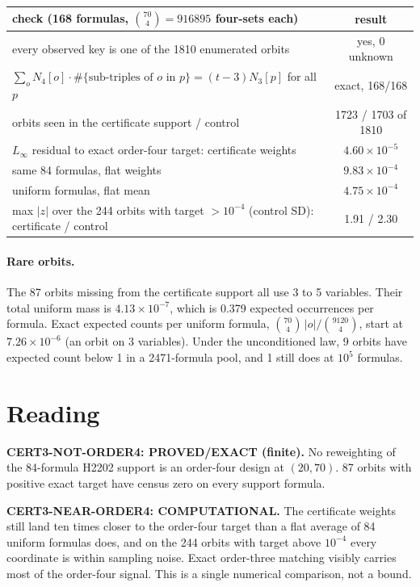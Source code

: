 \documentclass[11pt]{article}
\begin{document}
\begin{center}\begin{tabular}{lc}\toprule
check (168 formulas, $\binom{70}{4}=916895$ four-sets each) & result\\\midrule
every observed key is one of the 1810 enumerated orbits & yes, 0 unknown\\
$\sum_o N_4[o]\cdot\#\{\text{sub-triples of }o\text{ in }p\}=(t-3)N_3[p]$ for all $p$ & exact, 168/168\\
orbits seen in the certificate support / control & 1723 / 1703 of 1810\\\midrule
$L_\infty$ residual to exact order-four target: certificate weights & $4.60\times10^{-5}$\\
\quad same 84 formulas, flat weights & $9.83\times10^{-4}$\\
\quad 84 uniform formulas, flat mean & $4.75\times10^{-4}$\\
max $|z|$ over the 244 orbits with target $>10^{-4}$ (control SD): certificate / control & 1.91 / 2.30\\\bottomrule
\end{tabular}\end{center}

\paragraph{Rare orbits.} The 87 orbits missing from the certificate support all use 3 to 5 variables. Their total uniform mass is $4.13\times10^{-7}$, which is 0.379 expected occurrences per formula. Exact expected counts per uniform formula, $\binom{70}{4}\,|o|/\binom{9120}{4}$, start at $7.26\times10^{-6}$ (an orbit on 3 variables). Under the unconditioned law, 9 orbits have expected count below 1 in a 2471-formula pool, and 1 still does at $10^5$ formulas.

\section*{Reading}
\textbf{CERT3-NOT-ORDER4: PROVED/EXACT (finite).} No reweighting of the 84-formula H2202 support is an order-four design at $(20,70)$. 87 orbits with positive exact target have census zero on every support formula.

\textbf{CERT3-NEAR-ORDER4: COMPUTATIONAL.} The certificate weights still land ten times closer to the order-four target than a flat average of 84 uniform formulas does, and on the 244 orbits with target above $10^{-4}$ every coordinate is within sampling noise. Exact order-three matching visibly carries most of the order-four signal. This is a single numerical comparison, not a bound.
\end{document}
